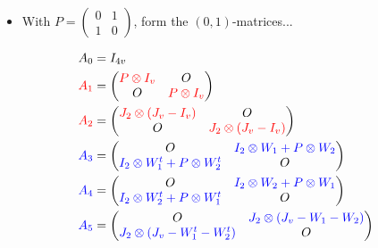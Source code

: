 \documentclass{beamer}
\newcommand{\rred}[1]{\textcolor{red}{#1}}
\newcommand{\bblue}[1]{\textcolor{blue}{#1}}
\begin{document}
\begin{frame}

  \begin{itemize}
  \item With $P=\left( \begin{smallmatrix} 0&1\\1&0 \end{smallmatrix}
    \right)$, form the $(0,1)$-matrices...
  \end{itemize}

  \[
    \begin{align*}
      A_0 &= I_{4v} \\
      \rred{A_1} &= \begin{pmatrix}
               \rred{P \otimes I_v} & O \\ O & \rred{P \otimes I_v}
             \end{pmatrix} \\
      \rred{A_2} &= \begin{pmatrix}
               \rred{J_2 \otimes (J_v-I_v)} & O \\ O & \rred{J_2 \otimes (J_v-I_v)} 
             \end{pmatrix} \\
      \bblue{A_3} &= \begin{pmatrix}
               O & \bblue{I_2 \otimes W_1 + P \otimes W_2} \\
               \bblue{I_2 \otimes W_1^t + P \otimes W_2^t} & O
             \end{pmatrix} \\
      \bblue{A_4} &= \begin{pmatrix}
               O & \bblue{I_2 \otimes W_2 + P \otimes W_1} \\
               \bblue{I_2 \otimes W_2^t + P \otimes W_1^t} & O              
             \end{pmatrix} \\
      \bblue{A_5} &= \begin{pmatrix}
               O & \bblue{J_2 \otimes (J_v - W_1 - W_2)} \\
               \bblue{J_2 \otimes (J_v - W_1^t - W_2^t)} & O
             \end{pmatrix}
    \end{align*}
  \]
  
\end{frame}
\end{document}
